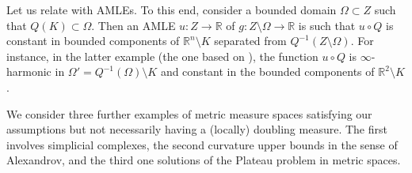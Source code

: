 \documentclass[reqno]{amsart}
\numberwithin{equation}{section}
\theoremstyle{remark}
\begin{document}
 Let us relate  with AMLEs. To this end, consider a bounded domain $\Omega \subset Z$ such that $Q(K) \subset \Omega$. Then an AMLE $u \colon Z \rightarrow \mathbb{R}$ of $g \colon Z \setminus \Omega \rightarrow \mathbb{R}$ is such that $u \circ Q$ is constant in bounded components of $\mathbb{R}^n \setminus K$ separated from $Q^{-1}( Z \setminus \Omega )$. For instance, in the latter example (the one based on \cite[Example, p. 1308-1309]{Younsi:16}), the function $u \circ Q$ is $\infty$-harmonic in $\Omega' = Q^{-1}( \Omega ) \setminus K$ and constant in the bounded components of $\mathbb{R}^2 \setminus K$.

We consider three further examples of metric measure spaces satisfying our assumptions but not necessarily having a (locally) doubling measure. The first involves simplicial complexes, the second curvature upper bounds in the sense of Alexandrov, and the third one solutions of the Plateau problem in metric spaces.
\end{document}
